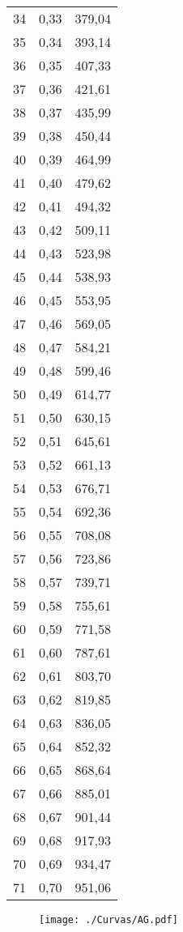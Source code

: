 \documentclass[]{article}
\begin{document}
\begin{longtable}[t]{ccc}
34 & 0,33 & 379,04\\
35 & 0,34 & 393,14\\
36 & 0,35 & 407,33\\
37 & 0,36 & 421,61\\
38 & 0,37 & 435,99\\
39 & 0,38 & 450,44\\
40 & 0,39 & 464,99\\
41 & 0,40 & 479,62\\
42 & 0,41 & 494,32\\
43 & 0,42 & 509,11\\
44 & 0,43 & 523,98\\
45 & 0,44 & 538,93\\
46 & 0,45 & 553,95\\
47 & 0,46 & 569,05\\
48 & 0,47 & 584,21\\
49 & 0,48 & 599,46\\
50 & 0,49 & 614,77\\
51 & 0,50 & 630,15\\
52 & 0,51 & 645,61\\
53 & 0,52 & 661,13\\
54 & 0,53 & 676,71\\
55 & 0,54 & 692,36\\
56 & 0,55 & 708,08\\
57 & 0,56 & 723,86\\
58 & 0,57 & 739,71\\
59 & 0,58 & 755,61\\
60 & 0,59 & 771,58\\
61 & 0,60 & 787,61\\
62 & 0,61 & 803,70\\
63 & 0,62 & 819,85\\
64 & 0,63 & 836,05\\
65 & 0,64 & 852,32\\
66 & 0,65 & 868,64\\
67 & 0,66 & 885,01\\
68 & 0,67 & 901,44\\
69 & 0,68 & 917,93\\
70 & 0,69 & 934,47\\
71 & 0,70 & 951,06\\*
\end{longtable}

\clearpage

\begin{sidewaysfigure}[htb]
   \centering
   \texttt{[image: ./Curvas/AG.pdf]}
\end{sidewaysfigure}
\end{document}
